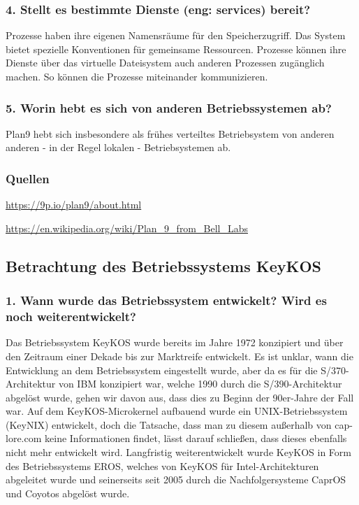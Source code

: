 \documentclass[numbers=noendperiod]{scrartcl}
\begin{document}
\subsubsection*{4. Stellt es bestimmte Dienste (eng: services) bereit?}
Prozesse haben ihre eigenen Namensräume für den Speicherzugriff. Das System bietet spezielle Konventionen für gemeinsame Ressourcen.
Prozesse können ihre Dienste über das virtuelle Dateisystem auch anderen Prozessen zugänglich machen. So können die Prozesse miteinander kommunizieren.

\subsubsection*{5. Worin hebt es sich von anderen Betriebssystemen ab?}
Plan9 hebt sich insbesondere als frühes verteiltes Betriebsystem von anderen anderen - in der Regel lokalen - Betriebsystemen ab.

\subsubsection*{Quellen}
\url{https://9p.io/plan9/about.html}

\url{https://en.wikipedia.org/wiki/Plan_9_from_Bell_Labs}

\subsection*{Betrachtung des Betriebssystems KeyKOS}

\subsubsection*{1. Wann wurde das Betriebssystem entwickelt? Wird es noch weiterentwickelt?}

Das Betriebssystem KeyKOS wurde bereits im Jahre 1972 konzipiert und über den Zeitraum einer Dekade bis zur Marktreife entwickelt. Es ist unklar, wann die Entwicklung an dem Betriebssystem eingestellt wurde, aber da es für die S/370-Architektur von IBM konzipiert war, welche 1990 durch die S/390-Architektur abgelöst wurde, gehen wir davon aus, dass dies zu Beginn der 90er-Jahre der Fall war. Auf dem KeyKOS-Microkernel aufbauend wurde ein UNIX-Betriebssystem (KeyNIX) entwickelt, doch die Tatsache, dass man zu diesem außerhalb von cap-lore.com keine Informationen findet, lässt darauf schließen, dass dieses ebenfalls nicht mehr entwickelt wird.
Langfristig weiterentwickelt wurde KeyKOS in Form des Betriebssystems EROS, welches von KeyKOS für Intel-Architekturen abgeleitet wurde und seinerseits seit 2005 durch die Nachfolgersysteme CaprOS und Coyotos abgelöst wurde.
\end{document}
